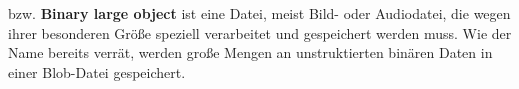 bzw. \textbf{Binary large object} ist eine Datei, meist Bild- oder Audiodatei, die wegen
ihrer besonderen Größe speziell verarbeitet und gespeichert werden muss. Wie der Name bereits verrät, 
werden große Mengen an unstruktierten binären Daten in einer Blob-Datei gespeichert.